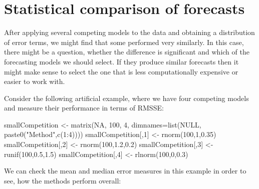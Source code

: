 \documentclass[
]{book}
\newenvironment{Shaded}{\begin{snugshade}}{\end{snugshade}}
\newcommand{\AttributeTok}[1]{\textcolor[rgb]{0.77,0.63,0.00}{#1}}
\newcommand{\ConstantTok}[1]{\textcolor[rgb]{0.00,0.00,0.00}{#1}}
\newcommand{\DecValTok}[1]{\textcolor[rgb]{0.00,0.00,0.81}{#1}}
\newcommand{\FloatTok}[1]{\textcolor[rgb]{0.00,0.00,0.81}{#1}}
\newcommand{\FunctionTok}[1]{\textcolor[rgb]{0.00,0.00,0.00}{#1}}
\newcommand{\NormalTok}[1]{#1}
\newcommand{\OtherTok}[1]{\textcolor[rgb]{0.56,0.35,0.01}{#1}}
\newcommand{\SpecialCharTok}[1]{\textcolor[rgb]{0.00,0.00,0.00}{#1}}
\newcommand{\StringTok}[1]{\textcolor[rgb]{0.31,0.60,0.02}{#1}}
\theoremstyle{definition}
\theoremstyle{definition}
\theoremstyle{definition}
\theoremstyle{definition}
\theoremstyle{remark}
\begin{document}
\hypertarget{statisticalTests}{%
\section{Statistical comparison of forecasts}\label{statisticalTests}}

After applying several competing models to the data and obtaining a distribution of error terms, we might find that some performed very similarly. In this case, there might be a question, whether the difference is significant and which of the forecasting models we should select. If they produce similar forecasts then it might make sense to select the one that is less computationally expensive or easier to work with.

Consider the following artificial example, where we have four competing models and measure their performance in terms of RMSSE:

\begin{Shaded}
\begin{Highlighting}[]
\NormalTok{smallCompetition }\OtherTok{\textless{}{-}} \FunctionTok{matrix}\NormalTok{(}\ConstantTok{NA}\NormalTok{, }\DecValTok{100}\NormalTok{, }\DecValTok{4}\NormalTok{,}
                           \AttributeTok{dimnames=}\FunctionTok{list}\NormalTok{(}\ConstantTok{NULL}\NormalTok{,}
                                         \FunctionTok{paste0}\NormalTok{(}\StringTok{"Method"}\NormalTok{,}\FunctionTok{c}\NormalTok{(}\DecValTok{1}\SpecialCharTok{:}\DecValTok{4}\NormalTok{))))}
\NormalTok{smallCompetition[,}\DecValTok{1}\NormalTok{] }\OtherTok{\textless{}{-}} \FunctionTok{rnorm}\NormalTok{(}\DecValTok{100}\NormalTok{,}\DecValTok{1}\NormalTok{,}\FloatTok{0.35}\NormalTok{)}
\NormalTok{smallCompetition[,}\DecValTok{2}\NormalTok{] }\OtherTok{\textless{}{-}} \FunctionTok{rnorm}\NormalTok{(}\DecValTok{100}\NormalTok{,}\FloatTok{1.2}\NormalTok{,}\FloatTok{0.2}\NormalTok{)}
\NormalTok{smallCompetition[,}\DecValTok{3}\NormalTok{] }\OtherTok{\textless{}{-}} \FunctionTok{runif}\NormalTok{(}\DecValTok{100}\NormalTok{,}\FloatTok{0.5}\NormalTok{,}\FloatTok{1.5}\NormalTok{)}
\NormalTok{smallCompetition[,}\DecValTok{4}\NormalTok{] }\OtherTok{\textless{}{-}} \FunctionTok{rlnorm}\NormalTok{(}\DecValTok{100}\NormalTok{,}\DecValTok{0}\NormalTok{,}\FloatTok{0.3}\NormalTok{)}
\end{Highlighting}
\end{Shaded}

We can check the mean and median error measures in this example in order to see, how the methods perform overall:
\end{document}
